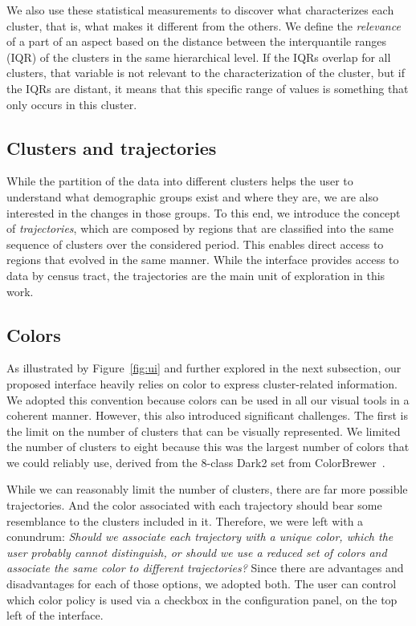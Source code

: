 We also use these statistical measurements to discover what characterizes each
cluster, that is, what makes it different from the others.  We define the
\emph{relevance} of a part of an aspect based on the distance between the
interquantile ranges (IQR) of the clusters in the same hierarchical level. If
the IQRs overlap for all clusters, that variable is not relevant to the
characterization of the cluster, but if the IQRs are distant, it means that this
specific range of values is something that only occurs in this cluster. 


\subsection{Clusters and trajectories}
While the partition of the data into different clusters helps the user to
understand what demographic groups exist and where they are, we are also
interested in the changes in those groups. To this end, we introduce the concept
of \emph{trajectories}, which are composed by regions that are classified into
the same sequence of clusters over the considered period. This enables direct
access to regions that evolved in the same manner. While the interface provides
access to data by census tract, the trajectories are the main unit of
exploration in this work.

\subsection{Colors}
\label{sec:colors}
As illustrated by Figure~\ref{fig:ui} and further explored in the next
subsection, our proposed interface heavily relies on color to express
cluster-related information. We adopted this convention because colors can be
used in all our visual tools in a coherent manner. However, this also introduced
significant challenges. The first is the limit on the number of clusters that
can be visually represented.  We limited the number of clusters to eight because
this was the largest number of colors that we could reliably use, derived from
the 8-class Dark2 set from ColorBrewer~\cite{ColorBrewer}. 

While we can reasonably limit the number of clusters, there are far more
possible trajectories. And the color associated with each trajectory should bear
some resemblance to the clusters included in it. Therefore, we were left with a
conundrum: \emph{Should we associate each trajectory with a unique color, which
the user probably cannot distinguish, or should we use a reduced set of colors
and associate the same color to different trajectories?} Since there are
advantages and disadvantages for each of those options, we adopted both. The
user can control which color policy is used via a checkbox in the configuration
panel, on the top left of the interface.

